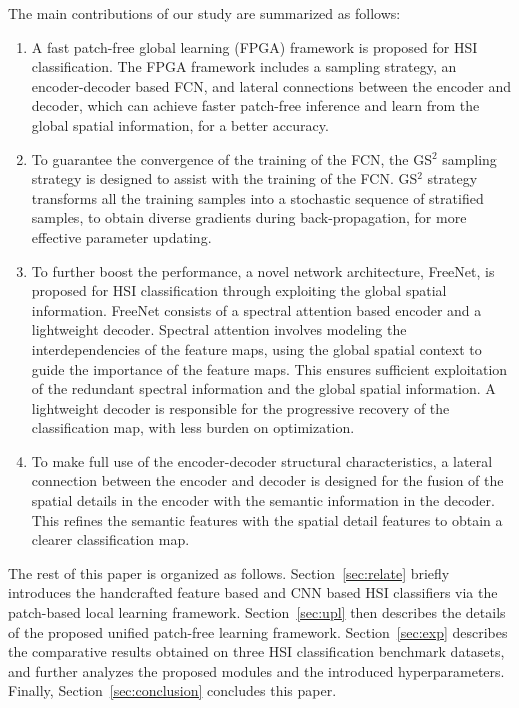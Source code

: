 \documentclass[journal]{IEEEtran}
\begin{document}
The main contributions of our study are summarized as follows:
\begin{enumerate}
  \item A fast patch-free global learning (FPGA) framework is proposed for HSI classification. The FPGA framework includes a sampling strategy, an encoder-decoder based FCN, and lateral connections between the encoder and decoder, which can achieve faster patch-free inference and learn from the global spatial information, for a better accuracy.
  \item To guarantee the convergence of the training of the FCN, the GS$^2$ sampling strategy is designed to assist with the training of the FCN. GS$^2$ strategy transforms all the training samples into a stochastic sequence of stratified samples, to obtain diverse gradients during back-propagation, for more effective parameter updating.
  \item To further boost the performance, a novel network architecture, FreeNet, is proposed for HSI classification through exploiting the global spatial information. FreeNet consists of a spectral attention based encoder and a lightweight decoder. Spectral attention involves modeling the interdependencies of the feature maps, using the global spatial context to guide the importance of the feature maps. This ensures sufficient exploitation of the redundant spectral information and the global spatial information. A lightweight decoder is responsible for the progressive recovery of the classification map, with less burden on optimization.
  \item To make full use of the encoder-decoder structural characteristics, a lateral connection between the encoder and decoder is designed for the fusion of the spatial details in the encoder with the semantic information in the decoder. This refines the semantic features with the spatial detail features to obtain a clearer classification map.
\end{enumerate}

The rest of this paper is organized as follows.
Section~\ref{sec:relate} briefly introduces the handcrafted feature based and CNN based HSI classifiers via the patch-based local learning framework.
Section~\ref{sec:upl} then describes the details of the proposed unified patch-free learning framework.
Section~\ref{sec:exp} describes the comparative results obtained on three HSI classification benchmark datasets, and further analyzes the proposed modules and the introduced hyperparameters.
Finally, Section~\ref{sec:conclusion} concludes this paper.
\end{document}
